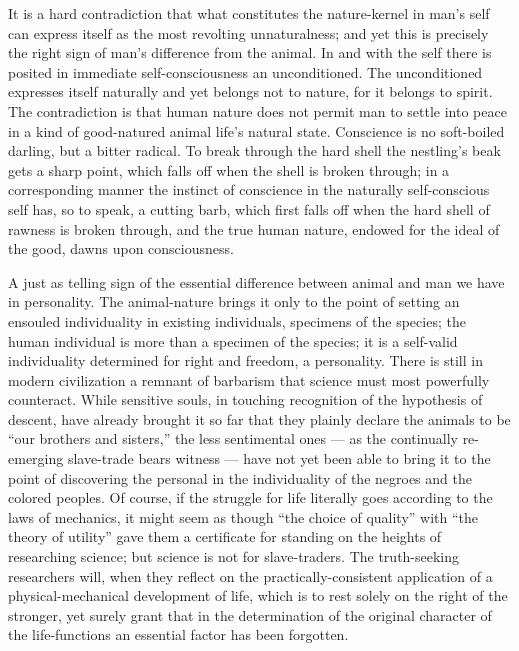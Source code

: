 \documentclass[12pt]{book}
\begin{document}
It is a hard contradiction that what constitutes the nature-kernel in man's self can express
itself as the most revolting unnaturalness; and yet this is precisely the right sign of man's
difference from the animal. In and with the self there is posited in immediate
self-consciousness an unconditioned. The unconditioned expresses itself naturally and yet
belongs not to nature, for it belongs to spirit. The contradiction is that human nature does
not permit man to settle into peace in a kind of good-natured animal life's natural state.
Conscience is no soft-boiled darling, but a bitter radical. To break through the hard shell the
nestling's beak gets a sharp point, which falls off when the shell is broken through; in a
corresponding manner the instinct of conscience in the naturally self-conscious self has, so to
speak, a cutting barb, which first falls off when the hard shell of rawness is broken through,
and the true human nature, endowed for the ideal of the good, dawns upon consciousness.

A just as telling sign of the essential difference between animal and man we have in
personality. The animal-nature brings it only to the point of setting an ensouled individuality
in existing individuals, specimens of the species; the human individual is more than a specimen
of the species; it is a self-valid individuality determined for right and freedom, a
personality. There is still in modern civilization a remnant of barbarism that science must
most powerfully counteract. While sensitive souls, in touching recognition of the hypothesis of
descent, have already brought it so far that they plainly declare the animals to be ``our
brothers and sisters,'' the less sentimental ones --- as the continually re-emerging slave-trade
bears witness --- have not yet been able to bring it to the point of discovering the personal in
the individuality of the negroes and the colored peoples. Of course, if the struggle for life
literally goes according to the laws of mechanics, it might seem as though ``the choice of
quality'' with ``the theory of utility'' gave them a certificate for standing on the heights of
researching science; but science is not for slave-traders. The truth-seeking researchers will,
when they reflect on the practically-consistent application of a physical-mechanical development
of life, which is to rest solely on the right of the stronger, yet surely grant that in the
determination of the original character of the life-functions an essential factor has been
forgotten.
\end{document}
